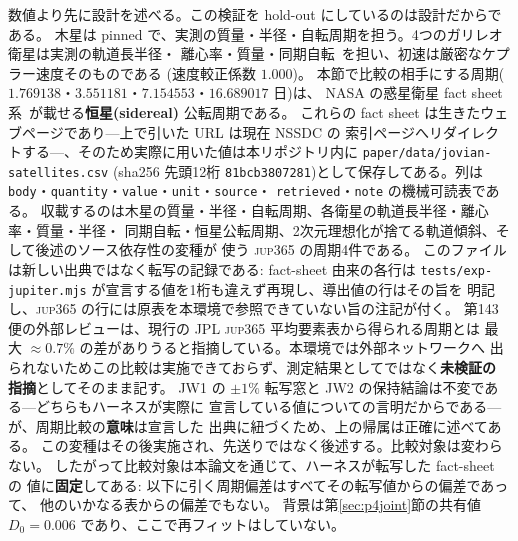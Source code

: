 \documentclass[a4paper,10pt,twocolumn]{ltjsarticle}
\begin{document}
数値より先に設計を述べる。この検証を hold-out にしているのは設計だからである。
木星は pinned で、実測の質量・半径・自転周期を担う。4つのガリレオ衛星は実測の軌道長半径・
離心率・質量・同期自転~\cite{NASASats}を担い、初速は厳密なケプラー速度そのものである
(速度較正係数 $1.000$)。
本節で比較の相手にする周期($1.769138$・$3.551181$・$7.154553$・$16.689017$ 日)は、
NASA の惑星衛星 fact sheet 系~\cite{NASASats}が載せる\textbf{恒星(sidereal)}
公転周期である。
これらの fact sheet は生きたウェブページであり---上で引いた URL は現在 NSSDC の
索引ページへリダイレクトする---、そのため実際に用いた値は本リポジトリ内に
\texttt{paper/\allowbreak data/\allowbreak jovian-\allowbreak satellites.csv}
(sha256 先頭12桁 \texttt{81bcb3807281})として保存してある。列は
\texttt{body}・\texttt{quantity}・\texttt{value}・\texttt{unit}・\texttt{source}・
\texttt{retrieved}・\texttt{note} の機械可読表である。
収載するのは木星の質量・半径・自転周期、各衛星の軌道長半径・離心率・質量・半径・
同期自転・恒星公転周期、2次元理想化が捨てる軌道傾斜、そして後述のソース依存性の変種が
使う \textsc{jup365} の周期4件である。
このファイルは新しい出典ではなく転写の記録である: fact-sheet 由来の各行は
\texttt{tests/exp-jupiter.mjs} が宣言する値を1桁も違えず再現し、導出値の行はその旨を
明記し、\textsc{jup365} の行には原表を本環境で参照できていない旨の注記が付く。
第143便の外部レビューは、現行の JPL \textsc{jup365} 平均要素表から得られる周期とは
最大 ${\approx}0.7\%$ の差がありうると指摘している。本環境では外部ネットワークへ
出られないためこの比較は実施できておらず、測定結果としてではなく\textbf{未検証の
指摘}としてそのまま記す。
JW1 の $\pm1\%$ 転写窓と JW2 の保持結論は不変である---どちらもハーネスが実際に
宣言している値についての言明だからである---が、周期比較の\textbf{意味}は宣言した
出典に紐づくため、上の帰属は正確に述べてある。
この変種はその後実施され、先送りではなく後述する。比較対象は変わらない。
したがって比較対象は本論文を通じて、ハーネスが転写した fact-sheet の
値に\textbf{固定}してある: 以下に引く周期偏差はすべてその転写値からの偏差であって、
他のいかなる表からの偏差でもない。
背景は第\ref{sec:p4joint}節の共有値 $D_0=0.006$ であり、ここで再フィットはしていない。
\end{document}
